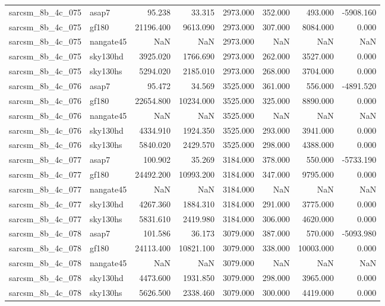 \begin{tabular}{llrrrrrr}
sarcsm\_8b\_4c\_075 & asap7 & 95.238 & 33.315 & 2973.000 & 352.000 & 493.000 & -5908.160 \\
sarcsm\_8b\_4c\_075 & gf180 & 21196.400 & 9613.090 & 2973.000 & 307.000 & 8084.000 & 0.000 \\
sarcsm\_8b\_4c\_075 & nangate45 & NaN & NaN & 2973.000 & NaN & NaN & NaN \\
sarcsm\_8b\_4c\_075 & sky130hd & 3925.020 & 1766.690 & 2973.000 & 262.000 & 3527.000 & 0.000 \\
sarcsm\_8b\_4c\_075 & sky130hs & 5294.020 & 2185.010 & 2973.000 & 268.000 & 3704.000 & 0.000 \\
sarcsm\_8b\_4c\_076 & asap7 & 95.472 & 34.569 & 3525.000 & 361.000 & 556.000 & -4891.520 \\
sarcsm\_8b\_4c\_076 & gf180 & 22654.800 & 10234.000 & 3525.000 & 325.000 & 8890.000 & 0.000 \\
sarcsm\_8b\_4c\_076 & nangate45 & NaN & NaN & 3525.000 & NaN & NaN & NaN \\
sarcsm\_8b\_4c\_076 & sky130hd & 4334.910 & 1924.350 & 3525.000 & 293.000 & 3941.000 & 0.000 \\
sarcsm\_8b\_4c\_076 & sky130hs & 5840.020 & 2429.570 & 3525.000 & 298.000 & 4388.000 & 0.000 \\
sarcsm\_8b\_4c\_077 & asap7 & 100.902 & 35.269 & 3184.000 & 378.000 & 550.000 & -5733.190 \\
sarcsm\_8b\_4c\_077 & gf180 & 24492.200 & 10993.200 & 3184.000 & 347.000 & 9795.000 & 0.000 \\
sarcsm\_8b\_4c\_077 & nangate45 & NaN & NaN & 3184.000 & NaN & NaN & NaN \\
sarcsm\_8b\_4c\_077 & sky130hd & 4267.360 & 1884.310 & 3184.000 & 291.000 & 3775.000 & 0.000 \\
sarcsm\_8b\_4c\_077 & sky130hs & 5831.610 & 2419.980 & 3184.000 & 306.000 & 4620.000 & 0.000 \\
sarcsm\_8b\_4c\_078 & asap7 & 101.586 & 36.173 & 3079.000 & 387.000 & 570.000 & -5093.980 \\
sarcsm\_8b\_4c\_078 & gf180 & 24113.400 & 10821.100 & 3079.000 & 338.000 & 10003.000 & 0.000 \\
sarcsm\_8b\_4c\_078 & nangate45 & NaN & NaN & 3079.000 & NaN & NaN & NaN \\
sarcsm\_8b\_4c\_078 & sky130hd & 4473.600 & 1931.850 & 3079.000 & 298.000 & 3965.000 & 0.000 \\
sarcsm\_8b\_4c\_078 & sky130hs & 5626.500 & 2338.460 & 3079.000 & 300.000 & 4419.000 & 0.000 \\

\end{tabular}
